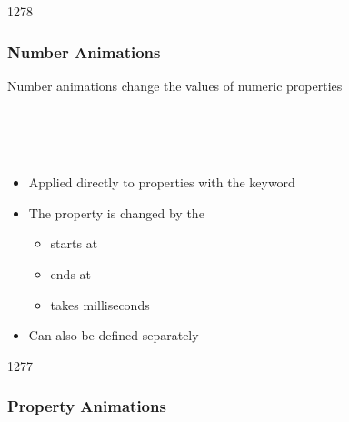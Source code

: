 
\begin{slide}{1278}\frametitle{Number Animations}

Number animations change the values of numeric properties

\vspace*{0.5em}
\begin{qml}
\\
\\
\\
\qtt{\}}
\end{qml}

\begin{itemize}
\item Applied directly to properties with the  keyword
\item The  property is changed by the 
  \begin{itemize}
  \item starts at 
  \item ends at 
  \item takes  milliseconds
  \end{itemize}
\item Can also be defined separately
\end{itemize}

\end{slide}


\begin{slide}{1277}\frametitle{Property Animations}



\end{slide}


